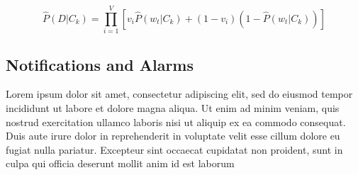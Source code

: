 \[
  \hat{P}(D|C_{k}) = \prod_{i=1}^{V}[v_{i}\hat{P}(w_{t}|C_{k}) + (1 - v_{i})(1 - \hat{P}(w_{t}|C_{k}))]
\]

\subsection{Notifications and Alarms}

Lorem ipsum dolor sit amet, consectetur adipiscing elit, sed do eiusmod tempor incididunt ut labore et dolore magna aliqua. Ut enim ad minim veniam, quis nostrud exercitation ullamco laboris nisi ut aliquip ex ea commodo consequat. Duis aute irure dolor in reprehenderit in voluptate velit esse cillum dolore eu fugiat nulla pariatur. Excepteur sint occaecat cupidatat non proident, sunt in culpa qui officia deserunt mollit anim id est laborum



